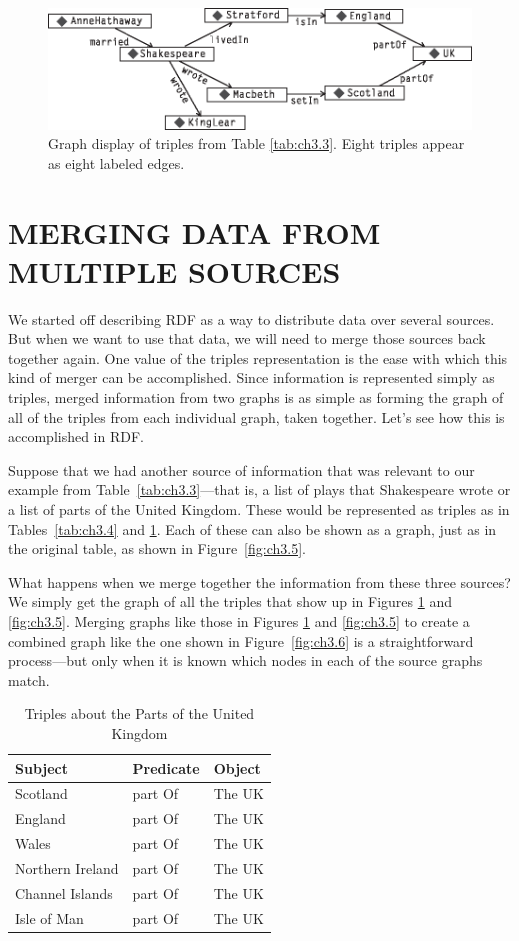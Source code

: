 \begin{figure}
    \centering
    \includegraphics[width=5.0in]{media/f03-04-9780123859655.eps}
    \caption{Graph display of triples from Table \ref{tab:ch3.3}. Eight triples appear as eight labeled edges.}
    \label{fig:ch3.4}
\end{figure}


\section{MERGING DATA FROM MULTIPLE SOURCES}

We started off describing RDF as a way to distribute data over several
sources. But when we want to use that data, we will need to merge those
sources back together again. One value of the triples representation is
the ease with which this kind of merger can be accomplished. Since
information is represented simply as triples, merged information from
two graphs is as simple as forming the graph of all of the triples from
each individual graph, taken together. Let's see how this is
accomplished in RDF.

Suppose that we had another source of information that was relevant to
our example from Table~\ref{tab:ch3.3}---that is, a list of plays that Shakespeare wrote or a list of parts
of the United Kingdom. These would be represented as triples as in
Tables~\ref{tab:ch3.4} and \ref{tab:ch3.5}. Each of these can also be shown as a graph, just as
in the original table, as shown in Figure~\ref{fig:ch3.5}.

What happens when we merge together the information from these three
sources? We simply get the graph of all the triples that show up in
Figures \ref{fig:ch3.4} and \ref{fig:ch3.5}. Merging graphs like those in Figures \ref{fig:ch3.4} and \ref{fig:ch3.5} to
create a combined graph like the one shown in Figure~\ref{fig:ch3.6} is a
straightforward process---but only when it is known which nodes in each
of the source graphs match.

\begin{table}[h]
\centering
\begin{tabular}{||l l l||} 
 \hline
 Subject&Predicate&Object \\ [0.5ex] 
 \hline\hline
Scotland&part Of&The UK \\
England&part Of&The UK \\
Wales&part Of&The UK\\
Northern Ireland&part Of&The UK \\
Channel Islands&part Of&The UK\\
Isle of Man&part Of&The UK\\
\hline
\end{tabular}
\caption{Triples about the Parts of the United Kingdom}
\label{tab:ch3.5}
\end{table}

